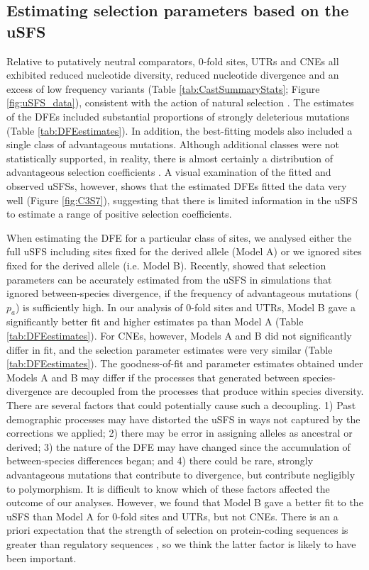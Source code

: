 \subsection{Estimating selection parameters based on the uSFS}

	Relative to putatively neutral comparators, 0-fold sites, UTRs and CNEs all exhibited reduced nucleotide diversity, reduced nucleotide divergence and an excess of low frequency variants (Table \ref{tab:CastSummaryStats}; Figure \ref{fig:uSFS_data}), consistent with the action of natural selection \citep{RN158, RN122}. The estimates of the DFEs included substantial proportions of strongly deleterious mutations (Table \ref{tab:DFEestimates}). In addition, the best-fitting models also included a single class of advantageous mutations. Although additional classes were not statistically supported, in reality, there is almost certainly a distribution of advantageous selection coefficients \citep{RN181, RN345}. A visual examination of the fitted and observed uSFSs, however, shows that the estimated DFEs fitted the data very well (Figure \ref{fig:C3S7}), suggesting that there is limited information in the uSFS to estimate a range of positive selection coefficients. 

	When estimating the DFE for a particular class of sites, we analysed either the full uSFS including sites fixed for the derived allele (Model A) or we ignored sites fixed for the derived allele (i.e. Model B). Recently,\cite{RN354} showed that selection parameters can be accurately estimated from the uSFS in simulations that ignored between-species divergence, if the frequency of advantageous mutations ($p_a$) is sufficiently high. In our analysis of 0-fold sites and UTRs, Model B gave a significantly better fit and higher estimates pa than Model A (Table \ref{tab:DFEestimates}). For CNEs, however, Models A and B did not significantly differ in fit, and the selection parameter estimates were very similar (Table \ref{tab:DFEestimates}). The goodness-of-fit and parameter estimates obtained under Models A and B may differ if the processes that generated between species-divergence are decoupled from the processes that produce within species diversity. There are several factors that could potentially cause such a decoupling. 1) Past demographic processes may have distorted the uSFS in ways not captured by the corrections we applied; 2) there may be error in assigning alleles as ancestral or derived; 3) the nature of the DFE may have changed since the accumulation of between-species differences began; and 4) there could be rare, strongly advantageous mutations that contribute to divergence, but contribute negligibly to polymorphism. It is difficult to know which of these factors affected the outcome of our analyses. However, we found that Model B gave a better fit to the uSFS than Model A for 0-fold sites and UTRs, but not CNEs. There is an a priori expectation that the strength of selection on protein-coding sequences is greater than regulatory sequences \cite{RN122}, so we think the latter factor is likely to have been important. 

